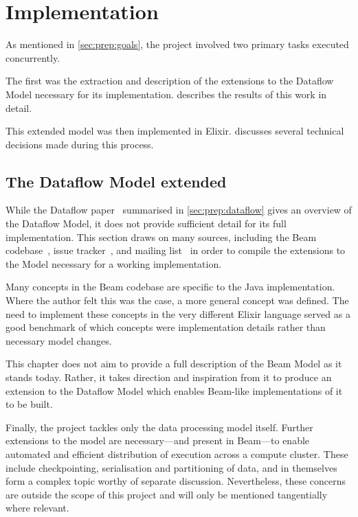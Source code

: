 \chapter{Implementation}\label{ch:impl}

As mentioned in \cref{sec:prep:goals}, the project involved two primary tasks executed concurrently.

The first was the extraction and description of the extensions to the Dataflow Model necessary for its implementation.
 describes the results of this work in detail.

This extended model was then implemented in Elixir.
 discusses several technical decisions made during this process.

\section{The Dataflow Model extended}\label{sec:impl:dataflow}

While the Dataflow paper~\cite{Akidau:2015} summarised in \cref{sec:prep:dataflow} gives an overview of the Dataflow Model, it does not provide sufficient detail for its full implementation.
This section draws on many sources, including the Beam codebase~\cite{Beam-code}, issue tracker~\cite{Beam-JIRA}, and mailing list~\cite{Beam-mailing} in order to compile the extensions to the Model necessary for a working implementation.

Many concepts in the Beam codebase are specific to the Java implementation.
Where the author felt this was the case, a more general concept was defined.
The need to implement these concepts in the very different Elixir language served as a good benchmark of which concepts were implementation details rather than necessary model changes.

This chapter does not aim to provide a full description of the Beam Model as it stands today.
Rather, it takes direction and inspiration from it to produce an extension to the Dataflow Model which enables Beam-like implementations of it to be built.

Finally, the project tackles only the data processing model itself.
Further extensions to the model are necessary---and present in Beam---to enable automated and efficient distribution of execution across a compute cluster.
These include checkpointing, serialisation and partitioning of data, and in themselves form a complex topic worthy of separate discussion.
Nevertheless, these concerns are outside the scope of this project and will only be mentioned tangentially where relevant.

